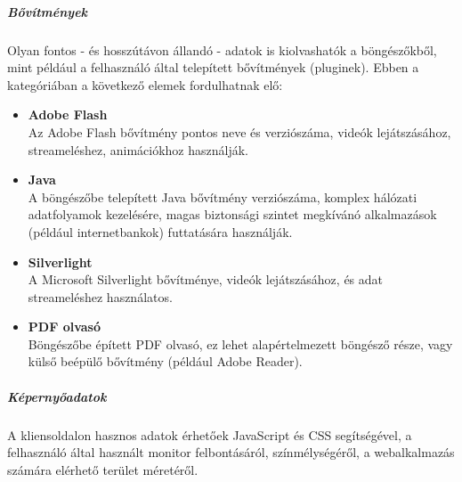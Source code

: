 \subparagraph{Bővítmények} %
\label{subp:bővítmények}
Olyan fontos - és hosszútávon állandó - adatok is kiolvashatók a böngészőkből, mint például a felhasználó által telepített bővítmények (pluginek). Ebben a kategóriában a következő elemek fordulhatnak elő:
\begin{itemize}
	\item{\textbf{Adobe Flash}}\hfill\\ 
		Az Adobe Flash bővítmény pontos neve és verziószáma, videók lejátszásához, streameléshez, animációkhoz használják.
		
	\item{\textbf{Java}}\hfill\\ 
		A böngészőbe telepített Java bővítmény verziószáma, komplex hálózati adatfolyamok kezelésére, magas biztonsági szintet megkívánó alkalmazások (például internetbankok) futtatására használják.
	\item{\textbf{Silverlight}}\hfill\\ 
		A Microsoft Silverlight bővítménye, videók lejátszásához, és adat streameléshez használatos.
	\item{\textbf{PDF olvasó}}\hfill\\ 
		Böngészőbe épített PDF olvasó, ez lehet alapértelmezett böngésző része, vagy külső beépülő bővítmény (például Adobe Reader).
\end{itemize}

\subparagraph{Képernyőadatok} %
\label{subp:képernyőadatok}
A kliensoldalon hasznos adatok érhetőek JavaScript és CSS segítségével, a felhasználó által használt monitor felbontásáról, színmélységéről, a webalkalmazás számára elérhető terület méretéről.

